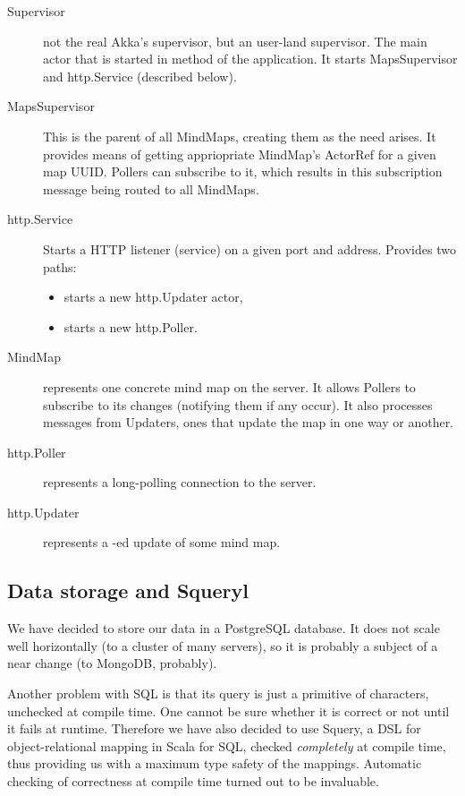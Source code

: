 \begin{description}
	\item[Supervisor] not the real Akka's supervisor, but an user-land supervisor. The main actor that is started in  method of the application. It starts MapsSupervisor and http.Service (described below).
	\item[MapsSupervisor] This is the parent of all MindMaps, creating them as the need arises. It provides means of getting appriopriate MindMap's ActorRef for a given map UUID. Pollers can subscribe to it, which results in this subscription message being routed to all MindMaps.
	\item[http.Service] Starts a HTTP listener (service) on a given port and address. Provides two paths: \begin{itemize}
		\item {} starts a new http.Updater actor,
		\item {} starts a new http.Poller.
	\end{itemize}
	\item[MindMap] represents one concrete mind map on the server. It allows Pollers to subscribe to its changes (notifying them if any occur). It also processes messages from Updaters, ones that update the map in one way or another.
	\item[http.Poller] represents a long-polling connection to the server.
	\item[http.Updater] represents a -ed update of some mind map.
\end{description}

\subsection{Data storage and Squeryl}
\label{subsection:akka-database}

We have decided to store our data in a PostgreSQL database. It does not scale well horizontally (to a cluster of many servers), so it is probably a subject of a near change (to MongoDB, probably).

Another problem with SQL is that its query is just a primitive  of characters, unchecked at compile time. One cannot be sure whether it is correct or not until it fails at runtime. Therefore we have also decided to use Squery, a DSL for object-relational mapping in Scala for SQL, checked \emph{completely} at compile time, thus providing us with a maximum type safety of the mappings. Automatic checking of correctness at compile time turned out to be invaluable.

